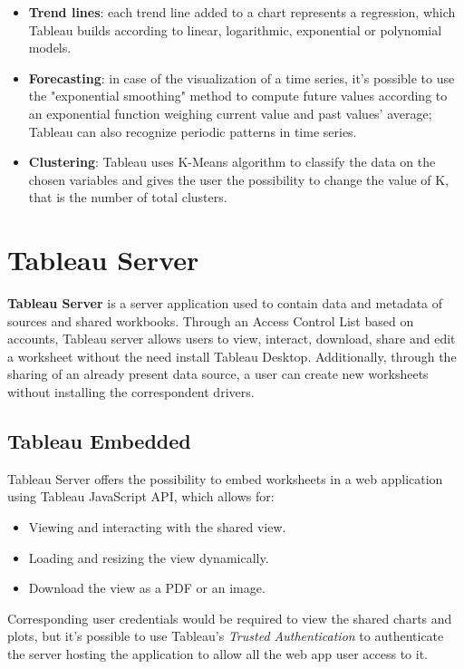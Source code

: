 \begin{itemize}
    \item \textbf{Trend lines}: each trend line added to a chart represents a regression, which Tableau builds according to linear, logarithmic, exponential or polynomial models.
    \item \textbf{Forecasting}: in case of the visualization of a time series, it's possible to use the "exponential smoothing" method to compute future values according to an exponential function weighing current value and past values' average; Tableau can also recognize periodic patterns in time series.
    \item \textbf{Clustering}: Tableau uses K-Means algorithm to classify the data on the chosen variables and gives the user the possibility to change the value of K, that is the number of total clusters.
\end{itemize}

\section{Tableau Server}

\textbf{Tableau Server} is a server application used to contain data and metadata of sources and shared workbooks. Through an Access Control List based on accounts, Tableau server allows users to view, interact, download, share and edit a worksheet without the need install Tableau Desktop. Additionally, through the sharing of an already present data source, a user can create new worksheets without installing the correspondent drivers.

\subsection{Tableau Embedded}

Tableau Server offers the possibility to embed worksheets in a web application using Tableau JavaScript API, which allows for:

\begin{itemize}
    \item Viewing and interacting with the shared view.
    \item Loading and resizing the view dynamically.
    \item Download the view as a PDF or an image.
\end{itemize}

Corresponding user credentials would be required to view the shared charts and plots, but it's possible to use Tableau's \textit{Trusted Authentication} to authenticate the server hosting the application to allow all the web app user access to it.